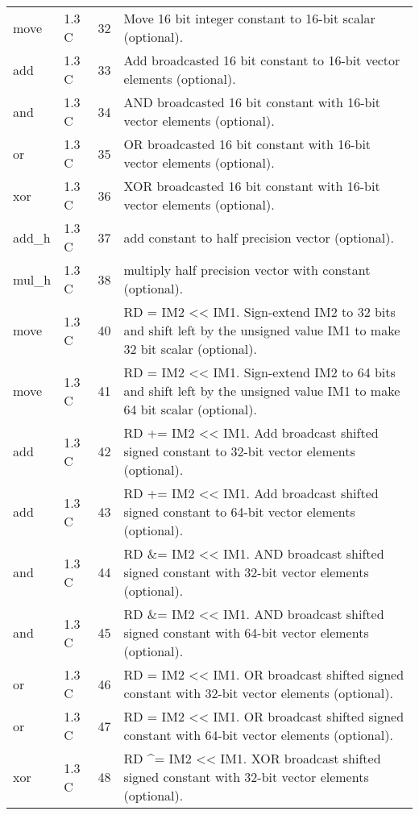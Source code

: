 \documentclass[forwardcom.tex]{subfiles}
\begin{document}
\begin{longtable} {|p{20mm}|p{10mm}|p{8mm}|p{75mm}|}
move          & 1.3 C & 32 & Move 16 bit integer constant to 16-bit scalar (optional). \\
add           & 1.3 C & 33 & Add broadcasted 16 bit constant to 16-bit vector elements (optional). \\
and           & 1.3 C & 34 & AND broadcasted 16 bit constant with 16-bit vector elements (optional). \\
or            & 1.3 C & 35 & OR broadcasted 16 bit constant with 16-bit vector elements (optional). \\
xor           & 1.3 C & 36 & XOR broadcasted 16 bit constant with 16-bit vector elements (optional). \\
add\_h        & 1.3 C & 37 & add constant to half precision vector (optional). \\
mul\_h        & 1.3 C & 38 & multiply half precision vector with constant (optional). \\
move          & 1.3 C & 40 & RD = IM2 \textless\textless{} IM1. Sign-extend IM2 to 32 bits and shift left by the unsigned value IM1 to make 32 bit scalar (optional). \\
move          & 1.3 C & 41 & RD = IM2 \textless\textless{} IM1. Sign-extend IM2 to 64 bits and shift left by the unsigned value IM1 to make 64 bit scalar (optional). \\
add           & 1.3 C & 42 & RD += IM2 \textless\textless{} IM1. Add broadcast shifted signed constant to 32-bit vector elements (optional). \\
add           & 1.3 C & 43 & RD += IM2 \textless\textless{} IM1. Add broadcast shifted signed constant to 64-bit vector elements (optional). \\
and           & 1.3 C & 44 & RD \&= IM2 \textless\textless{} IM1. AND broadcast shifted signed constant with 32-bit vector elements (optional). \\
and           & 1.3 C & 45 & RD \&= IM2 \textless\textless{} IM1. AND broadcast shifted signed constant with 64-bit vector elements (optional). \\
or            & 1.3 C & 46 & RD \textbar{}= IM2 \textless\textless{} IM1. OR broadcast shifted signed constant with 32-bit vector elements (optional). \\
or            & 1.3 C & 47 & RD \textbar{}= IM2 \textless\textless{} IM1. OR broadcast shifted signed constant with 64-bit vector elements (optional). \\
xor           & 1.3 C & 48 & RD \^{}= IM2 \textless\textless{} IM1. XOR broadcast shifted signed constant with 32-bit vector elements (optional). \\

\end{longtable}
\end{document}
